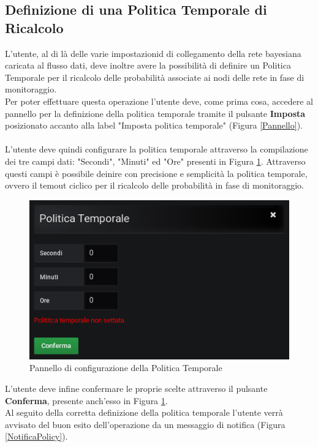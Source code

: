 \subsection{Definizione di una Politica Temporale di Ricalcolo}\label{policy}

L'utente, al di là delle varie impostazionid di collegamento della rete bayesiana caricata al flusso dati, deve inoltre avere la possibilità di definire un Politica Temporale per il ricalcolo delle probabilità associate ai nodi delle rete in fase di monitoraggio.\\
Per poter effettuare questa operazione l'utente deve, come prima cosa, accedere al pannello per la definizione della politica temporale tramite il pulsante \textbf{Imposta} posizionato accanto alla label "Imposta politica temporale" (Figura \ref{Pannello}).\\
~\\
L'utente deve quindi configurare la politica temporale attraverso la compilazione dei tre campi dati: "Secondi", "Minuti" ed "Ore" presenti in Figura \ref{PannelloPolicy}. Attraverso questi campi è possibile deinire con precisione e semplicità la politica temporale, ovvero il temout ciclico per il ricalcolo delle probabilità in fase di monitoraggio.

\begin{figure}[H]
	\begin{center}
		\includegraphics[scale=0.6]{./images/PannelloPolicy.png}
		 \caption{Pannello di configurazione della Politica Temporale}	
		 \label{PannelloPolicy}
	\end{center}
\end{figure} 

L'utente deve infine confermare le proprie scelte attraverso il pulsante \textbf{Conferma}, presente anch'esso in Figura \ref{PannelloPolicy}.
~\\
Al seguito della corretta definizione della politica temporale l'utente verrà avvisato del buon esito dell'operazione da un messaggio di notifica (Figura \ref{NotificaPolicy}). 

